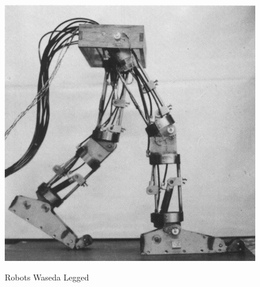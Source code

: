 \begin{figure}[H]
{\includegraphics[scale=0.5]{imagenes/apartado_2/29_2_WL_3_1969}}
\caption{Robots Waseda Legged}
\label{figura29}
\end{figure}

